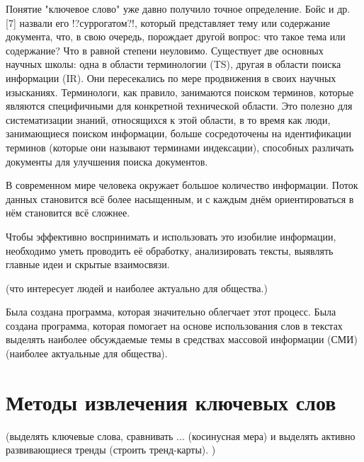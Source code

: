 \documentclass[bachelor, och, diploma ]{SCWorks}
\begin{document}
\tableofcontents







\intro

Понятие "ключевое слово" уже давно получило точное определение.
Бойс и др. [7] назвали его !?суррогатом?!, который представляет тему
или содержание документа, что, в свою очередь, порождает другой
вопрос: что такое тема или содержание? Что в равной степени неуловимо. Существует две основных научных школы: одна в области терминологии (TS), другая в области поиска информации (IR). Они пересекались по мере продвижения в своих научных изысканиях. Терминологи, как правило, занимаются поиском терминов, которые являются
специфичными для конкретной технической области. Это полезно для систематизации
знаний, относящихся к этой области, в то время как люди, занимающиеся поиском информации, больше сосредоточены на идентификации терминов (которые
они называют терминами индексации), способных различать
документы для улучшения поиска документов.





В современном мире человека окружает большое количество информации. Поток данных становится всё более насыщенным, и с каждым днём ориентироваться в нём становится всё сложнее.

Чтобы эффективно воспринимать и использовать это изобилие информации, необходимо уметь проводить её обработку, анализировать тексты, выявлять главные идеи и скрытые взаимосвязи. 

(что интересует людей и наиболее актуально для общества.) 

Была создана программа, которая значительно облегчает этот процесс. Была создана программа, которая помогает на основе использования слов в текстах выделять наиболее обсуждаемые темы в средствах массовой информации (СМИ) (наиболее актуальные для общества). 









\section{Методы извлечения ключевых слов}
(выделять ключевые слова, сравнивать ... (косинусная мера) и выделять активно развивающиеся тренды (строить тренд-карты). )
\end{document}
